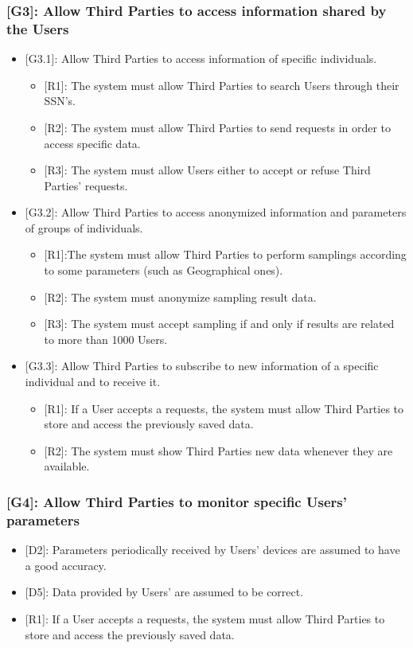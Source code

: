 \documentclass[12pt,a4paper]{article}
\begin{document}
	\subsubsection*{{[}{G3}{]}: Allow Third Parties to access information shared by the Users}
	\begin{itemize}
		\item {[G3.1]}: Allow Third Parties to access information of specific individuals.
		\begin{itemize}
			\item {[R1]}: The system must allow Third Parties to search Users through their SSN's.
			\item {[R2]}: The system must allow Third Parties to send requests in order to access specific data.
			\item {[R3]}: The system must allow Users either to accept or refuse Third Parties' requests.
		\end{itemize} 
		
		\item {[G3.2]}: Allow Third Parties to access anonymized information and parameters of groups of individuals.
		\begin{itemize}
			\item {[R1]}:The system must allow Third Parties to perform samplings according to some parameters (such as Geographical ones).
			\item {[R2]}: The system must anonymize sampling result data.
			\item {[R3]}: The system must accept sampling if and only if results are related to more than 1000 Users.
		\end{itemize} 
	
		\item {[G3.3]}: Allow Third Parties to subscribe to new information of a specific individual and to receive it.
		\begin{itemize}
			\item {[R1]}: If a User accepts a requests, the system must allow Third Parties to store and access the previously saved data.
			\item {[R2]}: The system must show Third Parties new data whenever they are available.
		\end{itemize}
	\end{itemize}
	\subsubsection*{{[}{G4}{]}: Allow Third Parties to monitor specific Users' parameters}
	\begin{itemize}
		\begin{itemize}
			\item {[D2]}: Parameters periodically received by Users' devices are assumed to have a good accuracy. 
			\item {[D5]}: Data provided by Users' are assumed to be correct. 
		
			\item {[R1]}: If a User accepts a requests, the system must allow Third Parties to store and access the previously saved data.
		\end{itemize}
	\end{itemize}
\end{document}
